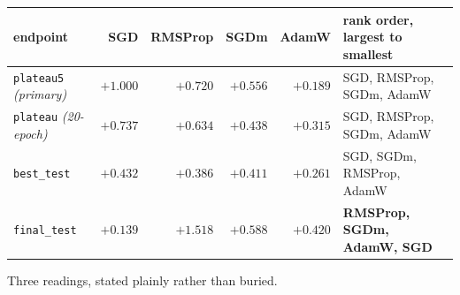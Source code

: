 \documentclass[10pt,letterpaper]{article}
\newcommand{\plateau}{\texttt{plateau5}}
\begin{document}
\begin{center}
\small
\begin{tabular}{@{}lrrrrl@{}}
\toprule
endpoint & SGD & RMSProp & SGDm & AdamW & rank order, largest to smallest \\
\midrule
\plateau{} \emph{(primary)}        & $+1.000$ & $+0.720$ & $+0.556$ & $+0.189$ & SGD, RMSProp, SGDm, AdamW \\
\texttt{plateau} \emph{(20-epoch)} & $+0.737$ & $+0.634$ & $+0.438$ & $+0.315$ & SGD, RMSProp, SGDm, AdamW \\
\texttt{best\_test}                & $+0.432$ & $+0.386$ & $+0.411$ & $+0.261$ & SGD, SGDm, RMSProp, AdamW \\
\texttt{final\_test}               & $+0.139$ & $+1.518$ & $+0.588$ & $+0.420$ & \textbf{RMSProp, SGDm, AdamW, SGD} \\
\bottomrule
\end{tabular}
\end{center}

Three readings, stated plainly rather than buried.
\end{document}
